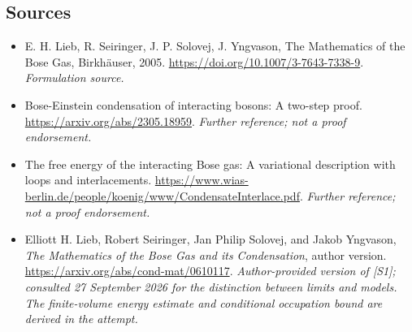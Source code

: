 \documentclass[11pt]{article}
\begin{document}
\subsection{Sources}
\begin{itemize}
\item[S1]E. H. Lieb, R. Seiringer, J. P. Solovej, J. Yngvason, The Mathematics of the Bose Gas, Birkhäuser, 2005.
\url{https://doi.org/10.1007/3-7643-7338-9}.
\textit{Formulation source.}
\item[S2]Bose-Einstein condensation of interacting bosons: A two-step proof.
\url{https://arxiv.org/abs/2305.18959}.
\textit{Further reference; not a proof endorsement.}
\item[S3]The free energy of the interacting Bose gas: A variational description with loops and interlacements.
\url{https://www.wias-berlin.de/people/koenig/www/CondensateInterlace.pdf}.
\textit{Further reference; not a proof endorsement.}
\item[E1]Elliott H. Lieb, Robert Seiringer, Jan Philip Solovej, and Jakob Yngvason, \emph{The Mathematics of the Bose Gas and its Condensation}, author version.
\url{https://arxiv.org/abs/cond-mat/0610117}.
\textit{Author-provided version of [S1]; consulted 27 September 2026 for the distinction between limits and models. The finite-volume energy estimate and conditional occupation bound are derived in the attempt.}
\end{itemize}
\end{document}
